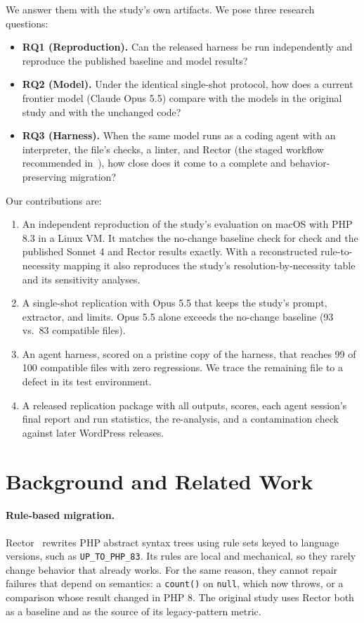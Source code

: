 \documentclass[11pt]{article}
\newcommand{\code}[1]{\texttt{#1}}
\begin{document}
We answer them with the study's own artifacts. We pose three research questions:
\begin{itemize}
  \item \textbf{RQ1 (Reproduction).} Can the released harness be run independently and reproduce the published baseline and model results?
  \item \textbf{RQ2 (Model).} Under the identical single-shot protocol, how does a current frontier model (Claude Opus 5.5) compare with the models in the original study and with the unchanged code?
  \item \textbf{RQ3 (Harness).} When the same model runs as a coding agent with an interpreter, the file's checks, a linter, and Rector (the staged workflow recommended in~\cite{mahmud2026modernization}), how close does it come to a complete and behavior-preserving migration?
\end{itemize}

Our contributions are:
\begin{enumerate}
  \item An independent reproduction of the study's evaluation on macOS with PHP 8.3 in a Linux VM. It matches the no-change baseline check for check and the published Sonnet 4 and Rector results exactly. With a reconstructed rule-to-necessity mapping it also reproduces the study's resolution-by-necessity table and its sensitivity analyses.
  \item A single-shot replication with Opus 5.5 that keeps the study's prompt, extractor, and limits. Opus 5.5 alone exceeds the no-change baseline (93 vs.\ 83 compatible files).
  \item An agent harness, scored on a pristine copy of the harness, that reaches 99 of 100 compatible files with zero regressions. We trace the remaining file to a defect in its test environment.
  \item A released replication package with all outputs, scores, each agent session's final report and run statistics, the re-analysis, and a contamination check against later WordPress releases.
\end{enumerate}

\section{Background and Related Work}

\paragraph{Rule-based migration.}
Rector~\cite{rector} rewrites PHP abstract syntax trees using rule sets keyed to language versions, such as \code{UP\_TO\_PHP\_83}.
Its rules are local and mechanical, so they rarely change behavior that already works.
For the same reason, they cannot repair failures that depend on semantics: a \code{count()} on \code{null}, which now throws, or a comparison whose result changed in PHP 8.
The original study uses Rector both as a baseline and as the source of its legacy-pattern metric.
\end{document}

